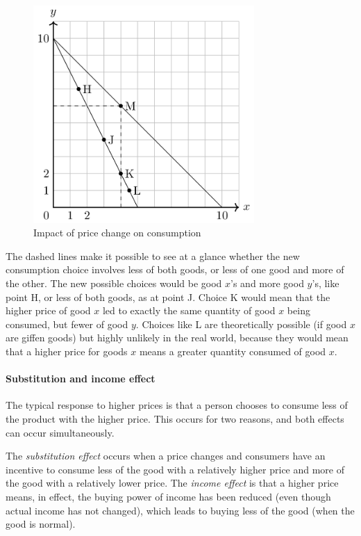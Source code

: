 \documentclass[
  12pt,
  oneside]{book}
\theoremstyle{definition}
\theoremstyle{definition}
\theoremstyle{definition}
\theoremstyle{definition}
\theoremstyle{remark}
\begin{document}
\begin{figure}
\centering
\includegraphics[width=0.75\textwidth,height=\textheight]{fig/pricechange.png}
\caption{\label{fig:pricechange} Impact of price change on consumption}
\end{figure}

The dashed lines make it possible to see at a glance whether the new consumption choice involves less of both goods, or less of one good and more of the other. The new possible choices would be good \(x\)'s and more good \(y\)'s, like point H, or less of both goods, as at point J. Choice K would mean that the higher price of good \(x\) led to exactly the same quantity of good \(x\) being consumed, but fewer of good \(y\). Choices like L are theoretically possible (if good \(x\) are giffen goods) but highly unlikely in the real world, because they would mean that a higher price for goods \(x\) means a greater quantity consumed of good \(x\).

\hypertarget{substitution-and-income-effect}{%
\paragraph*{Substitution and income effect}\label{substitution-and-income-effect}}

The typical response to higher prices is that a person chooses to consume less of the product with the higher price. This occurs for two reasons, and both effects can occur simultaneously.

The \emph{substitution effect} occurs when a price changes and consumers have an incentive to consume less of the good with a relatively higher price and more of the good with a relatively lower price.
The \emph{income effect} is that a higher price means, in effect, the buying power of income has been reduced (even though actual income has not changed), which leads to buying less of the good (when the good is normal).
\end{document}
